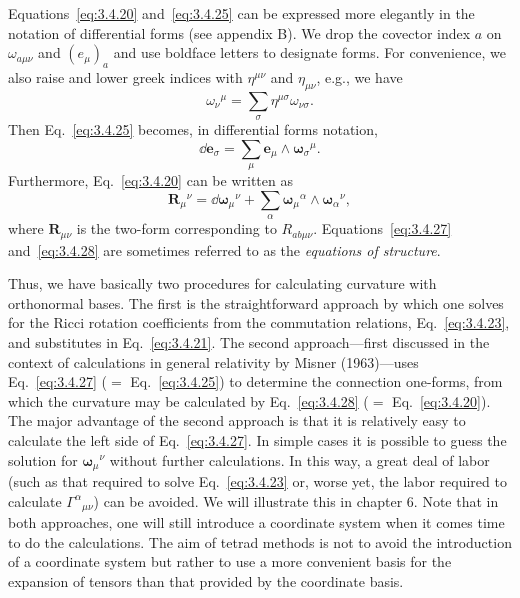 Equations~\eqref{eq:3.4.20} and~\eqref{eq:3.4.25} can be expressed more elegantly in the notation
of differential forms (see appendix B). We drop the covector index $a$ on $\omega_{a\mu\nu}$
and $(e_\mu)_a$ and use boldface letters to designate forms. For convenience, we also raise and
lower greek indices with $\eta^{\mu\nu}$ and $\eta_{\mu\nu}$, e.g., we have
\begin{equation}
  \omega_\nu{}^\mu=\sum_\sigma\eta^{\mu\sigma}\omega_{\nu\sigma}.
  \tag{3.4.26}\label{eq:3.4.26}
\end{equation}
Then Eq.~\eqref{eq:3.4.25} becomes, in differential forms notation,
\begin{equation}
  \dd\boldsymbol{e}_\sigma
  =\sum_\mu\boldsymbol{e}_\mu\wedge\boldsymbol{\omega}_\sigma{}^\mu.
  \tag{3.4.27}\label{eq:3.4.27}
\end{equation}
Furthermore, Eq.~\eqref{eq:3.4.20} can be written as
\begin{equation}
  \boldsymbol{R}_\mu{}^\nu
  =\dd\boldsymbol{\omega}_\mu{}^\nu
  +\sum_\alpha\boldsymbol{\omega}_\mu{}^\alpha\wedge\boldsymbol{\omega}_\alpha{}^\nu,
  \tag{3.4.28}\label{eq:3.4.28}
\end{equation}
where $\boldsymbol{R}_{\mu\nu}$ is the two-form corresponding to $R_{ab\mu\nu}$. Equations~\eqref{eq:3.4.27}
and~\eqref{eq:3.4.28} are sometimes referred to as the \emph{equations of structure}.

Thus, we have basically two procedures for calculating curvature with orthonormal bases. The first is the straightforward approach by which one solves for the
Ricci rotation coefficients from the commutation relations, Eq.~\eqref{eq:3.4.23}, and
substitutes in Eq.~\eqref{eq:3.4.21}. The second approach---first discussed in the context
of calculations in general relativity by Misner (1963)---uses Eq.~\eqref{eq:3.4.27}
($=$ Eq.~\eqref{eq:3.4.25}) to determine the connection one-forms, from which the curvature may be
calculated by Eq.~\eqref{eq:3.4.28} ($=$ Eq.~\eqref{eq:3.4.20}). The major advantage of the second
approach is that it is relatively easy to calculate the left side of Eq.~\eqref{eq:3.4.27}. In
simple cases it is possible to guess the solution for $\boldsymbol{\omega}_\mu{}^\nu$ without further calculations.
In this way, a great deal of labor (such as that required to solve Eq.~\eqref{eq:3.4.23} or, worse
yet, the labor required to calculate $\Gamma^\alpha{}_{\mu\nu}$) can be avoided. We will illustrate this in
chapter 6. Note that in both approaches, one will still introduce a coordinate system
when it comes time to do the calculations. The aim of tetrad methods is not to avoid
the introduction of a coordinate system but rather to use a more convenient basis for
the expansion of tensors than that provided by the coordinate basis.

